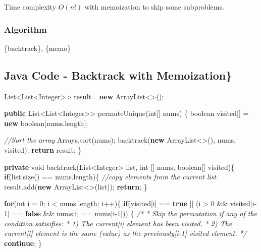 \documentclass[]{book}
\newenvironment{Shaded}{\begin{snugshade}}{\end{snugshade}}
\newcommand{\BuiltInTok}[1]{#1}
\newcommand{\CommentTok}[1]{\textcolor[rgb]{0.56,0.35,0.01}{\textit{#1}}}
\newcommand{\DataTypeTok}[1]{\textcolor[rgb]{0.13,0.29,0.53}{#1}}
\newcommand{\DecValTok}[1]{\textcolor[rgb]{0.00,0.00,0.81}{#1}}
\newcommand{\FunctionTok}[1]{\textcolor[rgb]{0.00,0.00,0.00}{#1}}
\newcommand{\KeywordTok}[1]{\textcolor[rgb]{0.13,0.29,0.53}{\textbf{#1}}}
\newcommand{\NormalTok}[1]{#1}
\begin{document}
Time complexity \(O(n!)\) with memoization to skip some subproblems.

\hypertarget{algorithm-15}{%
\subsubsection{Algorithm}\label{algorithm-15}}

\{backtrack\}, \{memo\}

\hypertarget{java-code---backtrack-with-memoization-1}{%
\subsection{Java Code - Backtrack with Memoization\}}\label{java-code---backtrack-with-memoization-1}}

\begin{Shaded}
\begin{Highlighting}[]
\BuiltInTok{List}\NormalTok{<}\BuiltInTok{List}\NormalTok{<}\BuiltInTok{Integer}\NormalTok{>> result= }\KeywordTok{new} \BuiltInTok{ArrayList}\NormalTok{<>();}

\KeywordTok{public} \BuiltInTok{List}\NormalTok{<}\BuiltInTok{List}\NormalTok{<}\BuiltInTok{Integer}\NormalTok{>> }\FunctionTok{permuteUnique}\NormalTok{(}\DataTypeTok{int}\NormalTok{[] nums) \{}
    \DataTypeTok{boolean}\NormalTok{ visited[] = }\KeywordTok{new} \DataTypeTok{boolean}\NormalTok{[nums.}\FunctionTok{length}\NormalTok{];}

    \CommentTok{//Sort the array}
    \BuiltInTok{Arrays}\NormalTok{.}\FunctionTok{sort}\NormalTok{(nums);}
    \FunctionTok{backtrack}\NormalTok{(}\KeywordTok{new} \BuiltInTok{ArrayList}\NormalTok{<>(), nums, visited);}
    \KeywordTok{return}\NormalTok{ result;}
\NormalTok{\}}

\KeywordTok{private} \DataTypeTok{void} \FunctionTok{backtrack}\NormalTok{(}\BuiltInTok{List}\NormalTok{<}\BuiltInTok{Integer}\NormalTok{> list, }\DataTypeTok{int}\NormalTok{ [] nums, }\DataTypeTok{boolean}\NormalTok{[] visited)\{}
    \KeywordTok{if}\NormalTok{(list.}\FunctionTok{size}\NormalTok{() == nums.}\FunctionTok{length}\NormalTok{)\{}
        \CommentTok{//copy elements from the current list}
\NormalTok{        result.}\FunctionTok{add}\NormalTok{(}\KeywordTok{new} \BuiltInTok{ArrayList}\NormalTok{<>(list));}
        \KeywordTok{return}\NormalTok{;}
\NormalTok{    \}}

    \KeywordTok{for}\NormalTok{(}\DataTypeTok{int}\NormalTok{ i = }\DecValTok{0}\NormalTok{; i < nums.}\FunctionTok{length}\NormalTok{; i++)\{}
        \KeywordTok{if}\NormalTok{(visited[i] == }\KeywordTok{true}\NormalTok{ || (i > }\DecValTok{0}\NormalTok{ && visited[i}\DecValTok{-1}\NormalTok{] == }\KeywordTok{false}\NormalTok{ && nums[i] == nums[i}\DecValTok{-1}\NormalTok{])) \{}
            \CommentTok{/*}
\CommentTok{            * Skip the permutation if any of the condition satisifies:}
\CommentTok{            * 1) The current[i] element has been visited.}
\CommentTok{            * 2) The current[i] element is the same (value) as the previously[i-1] visited element.}
\CommentTok{            */}
            \KeywordTok{continue}\NormalTok{;}
\NormalTok{        \}}


\end{Highlighting}
\end{Shaded}
\end{document}
